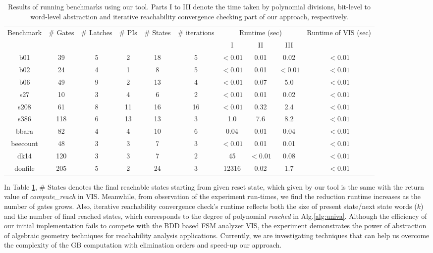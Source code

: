 \begin{table}[H]
\centering
\caption{Results of running benchmarks using our tool. 
\small{Parts I to III denote the time taken by polynomial divisions,
  bit-level to word-level abstraction and iterative reachability
  convergence checking part of our approach, respectively.}}
{\small 
\begin{tabular}{|c||c|c|c|c|c|c|c|c|c|}
\hline
\multirow{3}{*}{\centering Benchmark} 
& \multirow{3}{0.9cm}{\centering \# Gates} 
& \multirow{3}{1.1cm}{\centering \# Latches} 
& \multirow{3}{*}{\centering \# PIs}
 & \multirow{3}{0.9cm}{\centering \# States}
 & \multirow{3}{1.3cm}{\centering \# iterations}
 & \multicolumn{3}{c|}{\multirow{2}{2.0cm}{\centering Runtime (sec)}}
 & \multirow{3}{1.8cm}{\centering Runtime of VIS (sec)} \\
  & & & & & &\multicolumn{3}{c|}{}& \\
  \cline{7-9}
    & & & & & & I & II & III & \\
\hline
\hline
b01 & 39  & 5  & 2 & 18  & 5  & $<0.01$ & 0.01 & 0.02 & $<0.01$\\
b02 & 24  & 4  & 1 & 8 & 5 & $<0.01$  & 0.01 & $<0.01$ & $<0.01$ \\
b06 & 49  & 9  & 2 & 13 & 4 & $<0.01$ & 0.07 & 5.0 & $<0.01$ \\
s27 & 10 & 3 & 4 & 6 & 2 & $<0.01$ & 0.01 & 0.02  & $<0.01$  \\
s208 & 61 & 8 & 11 & 16 & 16 & $<0.01$ & 0.32 & 2.4 & $<0.01$ \\
s386 & 118 & 6 & 13 & 13  & 3 & 1.0 & 7.6 & 8.2  & $<0.01$ \\
bbara & 82 & 4 & 4 & 10 & 6 & 0.04 & 0.01 & 0.04  & $<0.01$ \\
beecount & 48  & 3  & 3 & 7  & 3  &$<0.01$ & 0.01 & 0.01 & $<0.01$ \\
dk14 & 120  & 3  & 3 & 7  & 2  & 45 & $<0.01$ & 0.08 & $<0.01$\\
donfile & 205  & 5  & 2 & 24 & 3  & 12316 & 0.02 & 1.7  & $<0.01$\\
\hline
\end{tabular}
}
\label{tab:recha_result}  
\end{table} 

In Table \ref{tab:recha_result}, \# States denotes the final reachable states
starting from given reset state, which given by our tool is the same with
the return value of {\it compute\_reach} in VIS. Meanwhile, from observation
of the experiment run-times, we find the reduction runtime increases
as the number of gates grows. Also, iterative reachability convergence
check's runtime reflects both the size of present state/next state
words ($k$) and the number of final reached states, which corresponds
to the degree of polynomial {\it reached} in Alg.\ref{alg:univa}. 
Although the efficiency of our initial implementation fails to compete
with the BDD based FSM analyzer VIS, the experiment
demonstrates the power of abstraction of algebraic geometry techniques
for reachability analysis applications. Currently, we are
investigating techniques that
can help us overcome the complexity of the GB computation with elimination
orders and speed-up our approach. 

